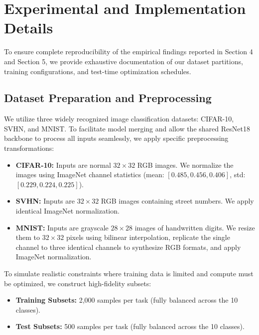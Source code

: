 \documentclass{article}
\theoremstyle{plain}
\theoremstyle{definition}
\theoremstyle{remark}
\begin{document}
\section{Experimental and Implementation Details}
\label{appendix-experimental}

To ensure complete reproducibility of the empirical findings reported in Section 4 and Section 5, we provide exhaustive documentation of our dataset partitions, training configurations, and test-time optimization schedules.

\subsection{Dataset Preparation and Preprocessing}
We utilize three widely recognized image classification datasets: CIFAR-10, SVHN, and MNIST. To facilitate model merging and allow the shared ResNet18 backbone to process all inputs seamlessly, we apply specific preprocessing transformations:
\begin{itemize}
    \item \textbf{CIFAR-10:} Inputs are normal $32 \times 32$ RGB images. We normalize the images using ImageNet channel statistics (mean: $[0.485, 0.456, 0.406]$, std: $[0.229, 0.224, 0.225]$).
    \item \textbf{SVHN:} Inputs are $32 \times 32$ RGB images containing street numbers. We apply identical ImageNet normalization.
    \item \textbf{MNIST:} Inputs are grayscale $28 \times 28$ images of handwritten digits. We resize them to $32 \times 32$ pixels using bilinear interpolation, replicate the single channel to three identical channels to synthesize RGB formats, and apply ImageNet normalization.
\end{itemize}
To simulate realistic constraints where training data is limited and compute must be optimized, we construct high-fidelity subsets:
\begin{itemize}
    \item \textbf{Training Subsets:} 2,000 samples per task (fully balanced across the 10 classes).
    \item \textbf{Test Subsets:} 500 samples per task (fully balanced across the 10 classes).
\end{itemize}
\end{document}

